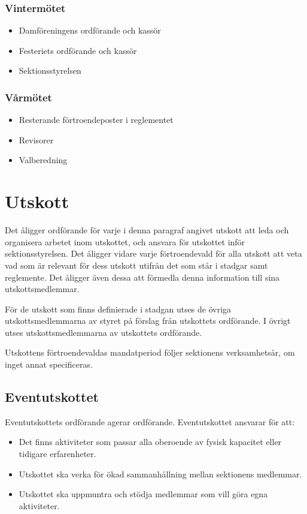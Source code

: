 \documentclass{datateknologsektionen-document}
\begin{document}
\subsubsection{Vintermötet}
\begin{itemize}
  \item Damföreningens ordförande och kassör
  \item Festeriets ordförande och kassör
  \item Sektionsstyrelsen
\end{itemize}

\subsubsection{Vårmötet}
\begin{itemize}
  \item Resterande förtroendeposter i reglementet
  \item Revisorer
  \item Valberedning
\end{itemize}

\section{Utskott}
Det åligger ordförande för varje i denna paragraf angivet utskott att leda och organisera arbetet inom utskottet, och
ansvara för utskottet inför sektionsstyrelsen. Det åligger vidare varje förtroendevald
för alla utskott att veta vad som är relevant för dess utskott utifrån det som står i
stadgar samt reglemente. Det åligger även dessa att förmedla denna information till
sina utskottsmedlemmar.

För de utskott som finns definierade i stadgan utses de övriga utskottsmedlemmarna av
styret på förslag från utskottets ordförande. I övrigt utses utskottsmedlemmarna av
utskottets ordförande.

Utskottens förtroendevaldas mandatperiod följer sektionens verksamhetsår, om inget annat specificeras.

\subsection{Eventutskottet}
Eventutskottets ordförande agerar ordförande. Eventutskottet ansvarar för att:
\begin{itemize}
  \item Det finns aktiviteter som passar alla oberoende av fysisk kapacitet eller tidigare erfarenheter.
  \item Utskottet ska verka för ökad sammanhållning mellan sektionens medlemmar.
  \item Utskottet ska uppmuntra och stödja medlemmar som vill göra egna aktiviteter.
\end{itemize}
\end{document}
